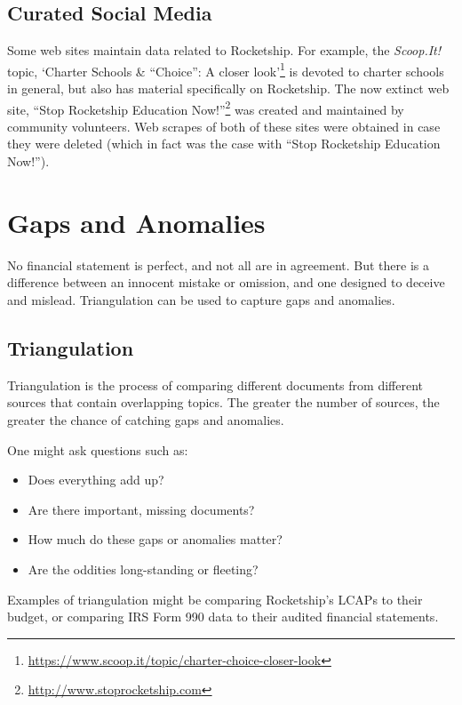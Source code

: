 \subsection{Curated Social Media}\label{sec:curated-social-media}%

Some web sites maintain data related to Rocketship. For example, the \textit{Scoop.It!} topic, `Charter Schools \& ``Choice'': A closer look'\footnote{\url{https://www.scoop.it/topic/charter-choice-closer-look}} is devoted to charter schools in general, but also has material specifically on Rocketship. The now extinct web site, ``Stop Rocketship Education Now!''\footnote{\url{http://www.stoprocketship.com}} was created and maintained by community volunteers. Web scrapes of both of these sites were obtained in case they were deleted (which in fact was the case with ``Stop Rocketship Education Now!'').

\section{Gaps and Anomalies}\label{sec:gaps-anomalies}%

No financial statement is perfect, and not all are in agreement. But there is a difference between an innocent mistake or omission, and one designed to deceive and mislead. Triangulation can be used to capture gaps and anomalies.

\subsection{Triangulation}\label{sec:triangulation}%

Triangulation is the process of comparing different documents from different sources that contain overlapping topics. The greater the number of sources, the greater the chance of catching gaps and anomalies.

One might ask questions such as:
\begin{itemize}
  \item Does everything add up? 
  \item Are there important, missing documents? 
  \item How much do these gaps or anomalies matter? 
  \item Are the oddities long-standing or fleeting? 
\end{itemize}
Examples of triangulation might be comparing Rocketship's LCAPs to their budget, or comparing IRS Form 990 data to their audited financial statements.


